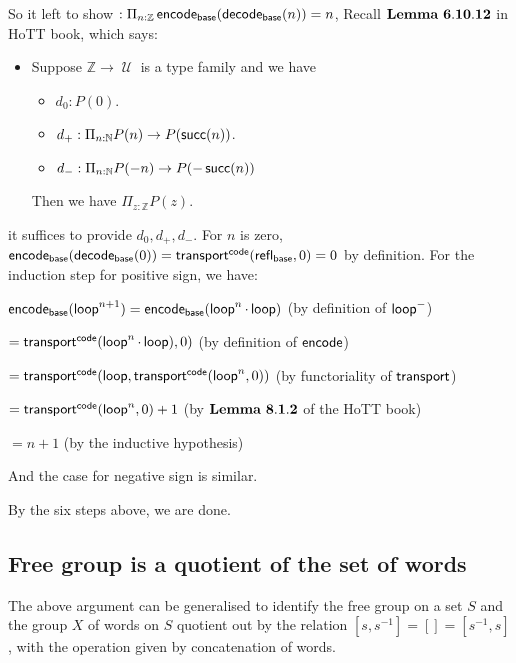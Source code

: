 \documentclass[11pt]{article}
\DeclareMathOperator{\cu}{\mathcal U}
\DeclareMathOperator{\base}{\sf base}
\DeclareMathOperator{\lp}{\sf loop}
\DeclareMathOperator{\code}{\sf code}
\DeclareMathOperator{\scr}{\sf succ}
\DeclareMathOperator{\encode}{\sf encode}
\DeclareMathOperator{\decode}{\sf decode}
\DeclareMathOperator{\transport}{\sf transport}
\DeclareMathOperator{\rfl}{\sf refl}
\theoremstyle{definition}
\begin{document}
So it left to show $:\Pi_{n:\mathbb Z}\encode_{\base}(\decode_{\base}(n))=n$, Recall $\bf Lemma \ 6.10.12$ in HoTT book, which says:

\begin{itemize}
    \item Suppose $\mathbb Z\to \cu$ is a type family and we have 
        \begin{itemize}
        \item $d_0:P(0)$.
        \item $d_+:\Pi_{n:\mathbb N}P(n)\to P(\scr (n))$.
        \item $d_-:\Pi_{n:\mathbb N}P(-n)\to P(-\scr (n))$
        \end{itemize}
       Then we have $\Pi_{z:\mathbb Z}P(z)$.
\end{itemize}

it suffices to provide $d_0,d_+,d_-$. For $n$ is zero, $\encode_{\base}(\decode_{\base}(0))=\transport^{\code}(\rfl_{\base},0)=0$ by definition. For the induction step for positive sign, we have:

$\encode_{\base}(\lp^{n+1})= \encode_{\base}(\lp^n\cdot \lp)$ (by definition of $\lp^-$)

$=\transport^{\code}(\lp^{n}\cdot \lp),0)$ (by definition of $\encode$)

$=\transport^{\code}(\lp,\transport^{\code}(\lp^{n},0))$ (by functoriality of $\transport$)

$= \transport^{\code}(\lp^n,0)+1$ (by $\bf Lemma \ 8.1.2$ of the HoTT book)

$=n+1$ (by the inductive hypothesis)

And the case for negative sign is similar.

By the six steps above, we are done.

\subsection{Free group is a quotient of the set of words}
The above argument can be generalised to identify the free group on a set $S$ and the group $X$ of words on $S$ quotient out by the relation $[s, s^{-1}]=[]=[s^{-1}, s]$, with the operation given by concatenation of words. 

\end{document}
